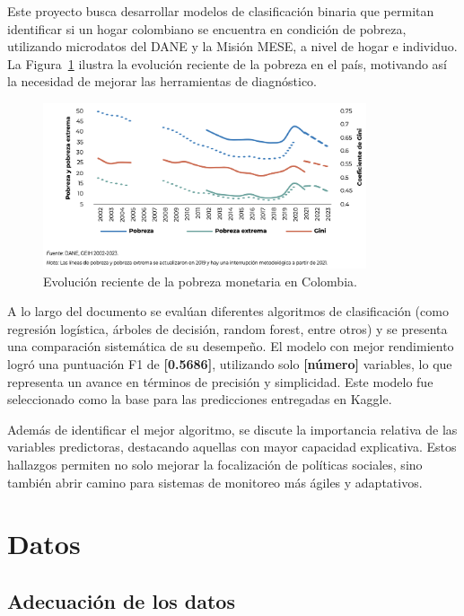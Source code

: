 \documentclass[12pt,a4paper,onecolumn]{article}
\begin{document}
Este proyecto busca desarrollar modelos de clasificación binaria que permitan identificar si un hogar colombiano se encuentra en condición de pobreza, utilizando microdatos del DANE y la Misión MESE, a nivel de hogar e individuo. La Figura~\ref{fig:pobreza_colombia} ilustra la evolución reciente de la pobreza en el país, motivando así la necesidad de mejorar las herramientas de diagnóstico.

\begin{figure}[H]
  \centering
  \includegraphics[width=0.85\textwidth]{../views/figures/pobreza_colombia.png}
  \caption{Evolución reciente de la pobreza monetaria en Colombia.}
  \label{fig:pobreza_colombia}
\end{figure}

A lo largo del documento se evalúan diferentes algoritmos de clasificación (como regresión logística, árboles de decisión, random forest, entre otros) y se presenta una comparación sistemática de su desempeño. El modelo con mejor rendimiento logró una puntuación F1 de \textbf{[0.5686]}, utilizando solo \textbf{[número]} variables, lo que representa un avance en términos de precisión y simplicidad. Este modelo fue seleccionado como la base para las predicciones entregadas en Kaggle.

Además de identificar el mejor algoritmo, se discute la importancia relativa de las variables predictoras, destacando aquellas con mayor capacidad explicativa. Estos hallazgos permiten no solo mejorar la focalización de políticas sociales, sino también abrir camino para sistemas de monitoreo más ágiles y adaptativos.

\section{Datos}
\subsection{Adecuación de los datos}
\end{document}
